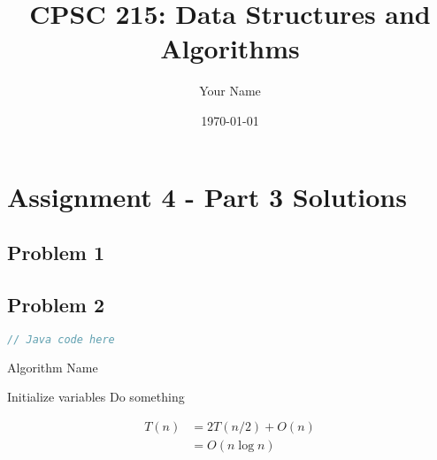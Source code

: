 \documentclass{article}
\title{CPSC 215: Data Structures and Algorithms}
\author{Your Name}
\date{\today}
\begin{document}
\maketitle

\section*{Assignment 4 - Part 3 Solutions}


\subsection*{Problem 1}

\subsection*{Problem 2}

\begin{lstlisting}[language=Java]
// Java code here
\end{lstlisting}

\begin{algorithm}
\caption{Algorithm Name}
\begin{algorithmic}[1]
\State Initialize variables
    \State Do something
\EndFor
\end{algorithmic}
\end{algorithm}

\begin{align}
T(n) &= 2T(n/2) + O(n)\\
&= O(n\log n)
\end{align}
\end{document}
